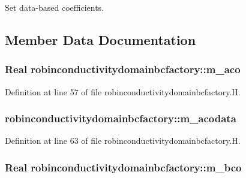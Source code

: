 Set data-\/based coefficients. 



\subsection{Member Data Documentation}
\subsubsection[{\texorpdfstring{m\+\_\+aco}{m_aco}}]{\setlength{\rightskip}{0pt plus 5cm}Real robinconductivitydomainbcfactory\+::m\+\_\+aco\hspace{0.3cm}{\ttfamily [protected]}}\hypertarget{classrobinconductivitydomainbcfactory_aacc80154b5af65a8e1e9fdf6f07f5cea}{}\label{classrobinconductivitydomainbcfactory_aacc80154b5af65a8e1e9fdf6f07f5cea}


Definition at line 57 of file robinconductivitydomainbcfactory.\+H.

\subsubsection[{\texorpdfstring{m\+\_\+acodata}{m_acodata}}]{ robinconductivitydomainbcfactory\+::m\+\_\+acodata\hspace{0.3cm}{\ttfamily [protected]}}\hypertarget{classrobinconductivitydomainbcfactory_a2d2a38f37f8377cc9c367f2bfb5ff550}{}\label{classrobinconductivitydomainbcfactory_a2d2a38f37f8377cc9c367f2bfb5ff550}


Definition at line 63 of file robinconductivitydomainbcfactory.\+H.

\subsubsection[{\texorpdfstring{m\+\_\+bco}{m_bco}}]{\setlength{\rightskip}{0pt plus 5cm}Real robinconductivitydomainbcfactory\+::m\+\_\+bco\hspace{0.3cm}{\ttfamily [protected]}}\hypertarget{classrobinconductivitydomainbcfactory_a81137da36f4e96fa2601e6def280edd8}{}\label{classrobinconductivitydomainbcfactory_a81137da36f4e96fa2601e6def280edd8}


